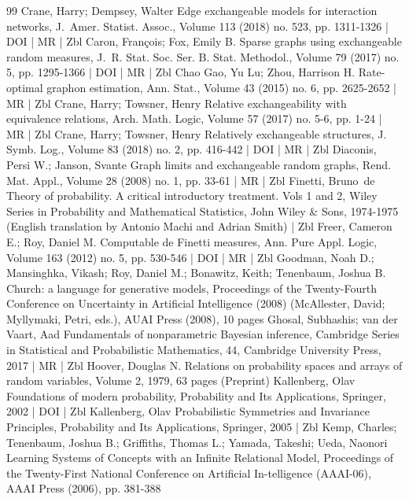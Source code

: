 \begin{thebibliography}{99}
Crane, Harry; Dempsey, Walter Edge exchangeable models for interaction networks, J. Amer. Statist. Assoc., Volume 113 (2018) no. 523, pp. 1311-1326 | DOI | MR | Zbl
Caron, François; Fox, Emily B. Sparse graphs using exchangeable random measures, J. R. Stat. Soc. Ser. B. Stat. Methodol., Volume 79 (2017) no. 5, pp. 1295-1366 | DOI | MR | Zbl
Chao Gao, Yu Lu; Zhou, Harrison H. Rate-optimal graphon estimation, Ann. Stat., Volume 43 (2015) no. 6, pp. 2625-2652 | MR | Zbl
Crane, Harry; Towsner, Henry Relative exchangeability with equivalence relations, Arch. Math. Logic, Volume 57 (2017) no. 5-6, pp. 1-24 | MR | Zbl
Crane, Harry; Towsner, Henry Relatively exchangeable structures, J. Symb. Log., Volume 83 (2018) no. 2, pp. 416-442 | DOI | MR | Zbl
Diaconis, Persi W.; Janson, Svante Graph limits and exchangeable random graphs, Rend. Mat. Appl., Volume 28 (2008) no. 1, pp. 33-61 | MR | Zbl
Finetti, Bruno de Theory of probability. A critical introductory treatment. Vols 1 and 2, Wiley Series in Probability and Mathematical Statistics, John Wiley \& Sons, 1974-1975 (English translation by Antonio Machi and Adrian Smith) | Zbl
Freer, Cameron E.; Roy, Daniel M. Computable de Finetti measures, Ann. Pure Appl. Logic, Volume 163 (2012) no. 5, pp. 530-546 | DOI | MR | Zbl
Goodman, Noah D.; Mansinghka, Vikash; Roy, Daniel M.; Bonawitz, Keith; Tenenbaum, Joshua B. Church: a language for generative models, Proceedings of the Twenty-Fourth Conference on Uncertainty in Artificial Intelligence (2008) (McAllester, David; Myllymaki, Petri, eds.), AUAI Press (2008), 10 pages
Ghosal, Subhashis; van der Vaart, Aad Fundamentals of nonparametric Bayesian inference, Cambridge Series in Statistical and Probabilistic Mathematics, 44, Cambridge University Press, 2017 | MR | Zbl
Hoover, Douglas N. Relations on probability spaces and arrays of random variables, Volume 2, 1979, 63 pages (Preprint)
Kallenberg, Olav Foundations of modern probability, Probability and Its Applications, Springer, 2002 | DOI | Zbl
Kallenberg, Olav Probabilistic Symmetries and Invariance Principles, Probability and Its Applications, Springer, 2005 | Zbl
Kemp, Charles; Tenenbaum, Joshua B.; Griffiths, Thomas L.; Yamada, Takeshi; Ueda, Naonori Learning Systems of Concepts with an Infinite Relational Model, Proceedings of the Twenty-First National Conference on Artificial In-telligence (AAAI-06), AAAI Press (2006), pp. 381-388

\end{thebibliography}
